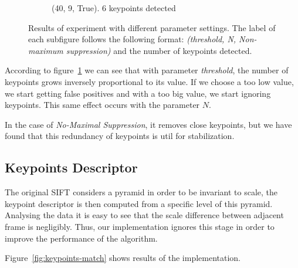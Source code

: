 \begin{figure}[h!]
\begin{subfigure}{0.5\textwidth}
  \caption{(40, 9, True). 6 keypoints detected}
\end{subfigure}
 \caption{Results of experiment with different parameter settings. The label of each subfigure follows the following format: \textit{(threshold, N, Non-maximum suppression)} and the number of keypoints detected.}
\label{fig:keypoints}
\end{figure}

According to figure~\ref{fig:keypoints} we can see that with parameter \textit{threshold}, the number of keypoints grows inversely proportional to its value. If we choose a too low value, we start getting false positives and with a too big value, we start ignoring keypoints. This same effect occurs with the parameter $N$.

In the case of \textit{No-Maximal Suppression}, it removes close keypoints, but we have found that this redundancy of keypoints is util for stabilization.


\subsection{Keypoints Descriptor}

The original SIFT considers a pyramid in order to be invariant to scale, the keypoint descriptor is then computed from a specific level of this pyramid. Analysing the data it is easy to see that the scale difference between adjacent frame is negligibly. Thus, our implementation ignores this stage in order to improve the performance of the algorithm.

Figure~\ref{fig:keypoints-match} shows results of the implementation.

